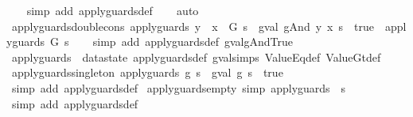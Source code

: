 \begin{isabellebody}
%
\isadelimproof
\ \ %
\endisadelimproof
%
\isatagproof
{}\isamarkupfalse%
\ {\isacharparenleft}simp\ add{\isacharcolon}\ apply{\isacharunderscore}guards{\isacharunderscore}def{\isacharparenright}\isanewline
\ \ \isamarkupfalse%
\ auto%
\endisatagproof
{\isafoldproof}%
%
\isadelimproof
\isanewline
%
\endisadelimproof
\isanewline
{}\isamarkupfalse%
\ apply{\isacharunderscore}guards{\isacharunderscore}double{\isacharunderscore}cons{\isacharcolon}\ {\isachardoublequoteopen}apply{\isacharunderscore}guards\ {\isacharparenleft}y\ {\isacharhash}\ x\ {\isacharhash}\ G{\isacharparenright}\ s\ {\isacharequal}\ {\isacharparenleft}gval\ {\isacharparenleft}gAnd\ y\ x{\isacharparenright}\ s\ {\isacharequal}\ true\ {\isasymand}\ apply{\isacharunderscore}guards\ G\ s{\isacharparenright}{\isachardoublequoteclose}\isanewline
%
\isadelimproof
\ \ %
\endisadelimproof
%
\isatagproof
{}\isamarkupfalse%
\ {\isacharparenleft}simp\ add{\isacharcolon}\ apply{\isacharunderscore}guards{\isacharunderscore}def\ gval{\isacharunderscore}gAnd{\isacharunderscore}True{\isacharparenright}%
\endisatagproof
{\isafoldproof}%
%
\isadelimproof
\isanewline
%
\endisadelimproof
\isanewline
{}\isamarkupfalse%
\ apply{\isacharunderscore}guards\ {\isacharequal}\ datastate\ apply{\isacharunderscore}guards{\isacharunderscore}def\ gval{\isachardot}simps\ ValueEq{\isacharunderscore}def\ ValueGt{\isacharunderscore}def\isanewline
\isanewline
{}\isamarkupfalse%
\ apply{\isacharunderscore}guards{\isacharunderscore}singleton{\isacharcolon}\ {\isachardoublequoteopen}{\isacharparenleft}apply{\isacharunderscore}guards\ {\isacharbrackleft}g{\isacharbrackright}\ s{\isacharparenright}\ {\isacharequal}\ {\isacharparenleft}gval\ g\ s\ {\isacharequal}\ true{\isacharparenright}{\isachardoublequoteclose}\isanewline
%
\isadelimproof
\ \ %
\endisadelimproof
%
\isatagproof
{}\isamarkupfalse%
\ {\isacharparenleft}simp\ add{\isacharcolon}\ apply{\isacharunderscore}guards{\isacharunderscore}def{\isacharparenright}%
\endisatagproof
{\isafoldproof}%
%
\isadelimproof
\isanewline
%
\endisadelimproof
\isanewline
{}\isamarkupfalse%
\ apply{\isacharunderscore}guards{\isacharunderscore}empty\ {\isacharbrackleft}simp{\isacharbrackright}{\isacharcolon}\ {\isachardoublequoteopen}apply{\isacharunderscore}guards\ {\isacharbrackleft}{\isacharbrackright}\ s{\isachardoublequoteclose}\isanewline
%
\isadelimproof
\ \ %
\endisadelimproof
%
\isatagproof
{}\isamarkupfalse%
\ {\isacharparenleft}simp\ add{\isacharcolon}\ apply{\isacharunderscore}guards{\isacharunderscore}def{\isacharparenright}%

\end{isabellebody}
